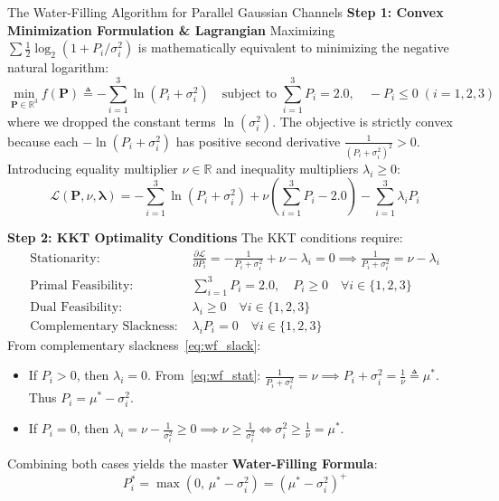 \begin{examplebox}[breakable]{The Water-Filling Algorithm for Parallel Gaussian Channels}
\textbf{Step 1: Convex Minimization Formulation \& Lagrangian}
Maximizing $\sum \frac{1}{2}\log_2(1 + P_i/\sigma_i^2)$ is mathematically equivalent to minimizing the negative natural logarithm:
\begin{equation}
\min_{\mathbf{P} \in \mathbb{R}^3} f(\mathbf{P}) \triangleq -\sum_{i=1}^3 \ln(P_i + \sigma_i^2) \quad \text{subject to } \sum_{i=1}^3 P_i = 2.0, \quad -P_i \le 0 \; (i=1, 2, 3)
\end{equation}
where we dropped the constant terms $\ln(\sigma_i^2)$. The objective is strictly convex because each $-\ln(P_i + \sigma_i^2)$ has positive second derivative $\frac{1}{(P_i + \sigma_i^2)^2} > 0$.
Introducing equality multiplier $\nu \in \mathbb{R}$ and inequality multipliers $\lambda_i \ge 0$:
\begin{equation}
\mathcal{L}(\mathbf{P}, \nu, \boldsymbol{\lambda}) = -\sum_{i=1}^3 \ln(P_i + \sigma_i^2) + \nu \left( \sum_{i=1}^3 P_i - 2.0 \right) - \sum_{i=1}^3 \lambda_i P_i
\end{equation}

\textbf{Step 2: KKT Optimality Conditions}
The KKT conditions require:
\begin{align}
\text{Stationarity: } & \frac{\partial \mathcal{L}}{\partial P_i} = -\frac{1}{P_i + \sigma_i^2} + \nu - \lambda_i = 0 \implies \frac{1}{P_i + \sigma_i^2} = \nu - \lambda_i \label{eq:wf_stat} \\
\text{Primal Feasibility: } & \sum_{i=1}^3 P_i = 2.0, \quad P_i \ge 0 \quad \forall i \in \{1, 2, 3\} \\
\text{Dual Feasibility: } & \lambda_i \ge 0 \quad \forall i \in \{1, 2, 3\} \\
\text{Complementary Slackness: } & \lambda_i P_i = 0 \quad \forall i \in \{1, 2, 3\} \label{eq:wf_slack}
\end{align}
From complementary slackness~\eqref{eq:wf_slack}:
\begin{itemize}
    \item If $P_i > 0$, then $\lambda_i = 0$. From~\eqref{eq:wf_stat}: $\frac{1}{P_i + \sigma_i^2} = \nu \implies P_i + \sigma_i^2 = \frac{1}{\nu} \triangleq \mu^*$. Thus $P_i = \mu^* - \sigma_i^2$.
    \item If $P_i = 0$, then $\lambda_i = \nu - \frac{1}{\sigma_i^2} \ge 0 \implies \nu \ge \frac{1}{\sigma_i^2} \iff \sigma_i^2 \ge \frac{1}{\nu} = \mu^*$.
\end{itemize}
Combining both cases yields the master \textbf{Water-Filling Formula}:
\begin{equation}
P_i^* = \max\left(0, \, \mu^* - \sigma_i^2\right) = (\mu^* - \sigma_i^2)^+
\end{equation}


\end{examplebox}

